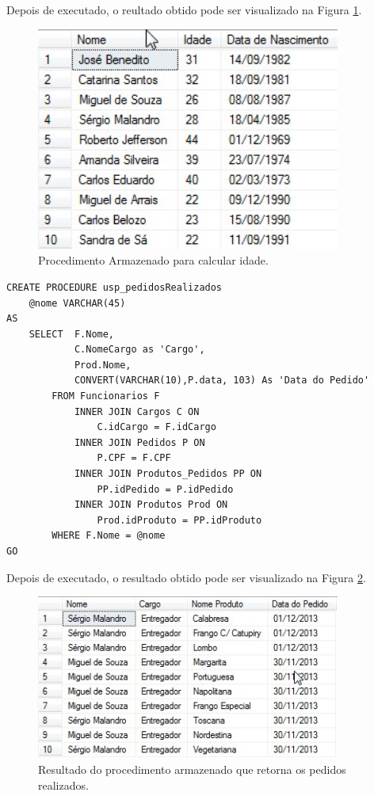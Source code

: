 \documentclass[
	12pt,				%
	openright,			%
	oneside,			%
	a4paper,			%
	chapter=TITLE,		%
	section=TITLE,		%
	english,			%
	brazil				%
	]{abntex2}
\begin{document}
    Depois de executado, o reultado obtido pode ser visualizado na Figura \ref{usp_001}.
    
    \begin{figure}[h]
         \centering
         \includegraphics[width=10cm,keepaspectratio]{Imgs/USP_001}
         \caption{Procedimento Armazenado para calcular idade.}
         \label{usp_001}
    \end{figure}
    
    \newpage
    
    \begin{lstlisting}
CREATE PROCEDURE usp_pedidosRealizados
	@nome VARCHAR(45)
AS
	SELECT  F.Nome, 
	        C.NomeCargo as 'Cargo', 
	        Prod.Nome, 
	        CONVERT(VARCHAR(10),P.data, 103) As 'Data do Pedido'  
        FROM Funcionarios F
            INNER JOIN Cargos C ON 
                C.idCargo = F.idCargo
            INNER JOIN Pedidos P ON 
                P.CPF = F.CPF
            INNER JOIN Produtos_Pedidos PP ON 
                PP.idPedido = P.idPedido
            INNER JOIN Produtos Prod ON 
                Prod.idProduto = PP.idProduto
        WHERE F.Nome = @nome     
GO
    \end{lstlisting}
    
    Depois de executado, o resultado obtido pode ser visualizado na Figura \ref{usp_002}.
    \begin{figure}[h]
         \centering
         \includegraphics[width=10cm,keepaspectratio]{Imgs/USP_002}
         \caption{Resultado do procedimento armazenado que retorna os pedidos realizados.}
         \label{usp_002}
    \end{figure}
    
\end{document}
